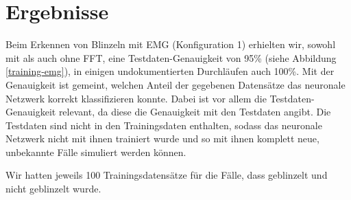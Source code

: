\documentclass[11pt]{scrartcl}
\begin{document}

	\section{Ergebnisse}

	Beim Erkennen von Blinzeln mit EMG (Konfiguration 1) erhielten wir, sowohl mit als auch ohne FFT, eine Testdaten-Genauigkeit von 95\% (siehe Abbildung \ref{training-emg}), in einigen undokumentierten Durchläufen auch 100\%. Mit der Genauigkeit ist gemeint, welchen Anteil der gegebenen Datensätze das neuronale Netzwerk korrekt klassifizieren konnte. Dabei ist vor allem die Testdaten-Genauigkeit relevant, da diese die Genauigkeit mit den Testdaten angibt. Die Testdaten sind nicht in den Trainingsdaten enthalten, sodass das neuronale Netzwerk nicht mit ihnen trainiert wurde und so mit ihnen komplett neue, unbekannte Fälle simuliert werden können.

	\begin{figure}[H]
	\end{figure}

	
	Wir hatten jeweils 100 Trainingsdatensätze für die Fälle, dass geblinzelt und nicht geblinzelt wurde.
\end{document}
